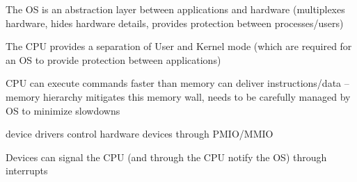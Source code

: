 \begin{summary}
	\begin{items}
		\setlength\itemsep{0em}
		\item The OS is an abstraction layer between applications and hardware (multiplexes hardware, hides hardware details, provides protection between processes/users)
		\item The CPU provides a separation of User and Kernel mode (which are required for an OS to provide protection between applications)
		\item CPU can execute commands faster than memory can deliver instructions/data -- memory hierarchy mitigates this memory wall, needs to be carefully managed by OS to minimize slowdowns
		\item device drivers control hardware devices through PMIO/MMIO
		\item Devices can signal the CPU (and through the CPU notify the OS) through interrupts
	\end{items}
\end{summary}
